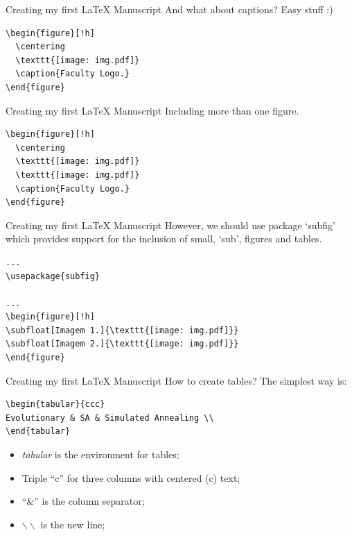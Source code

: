 \begin{frame}[fragile]{Creating my first \LaTeX{} Manuscript}
And what about captions? Easy stuff :)
\footnotesize
\begin{verbatim}
\begin{figure}[!h] 
  \centering                  
  \texttt{[image: img.pdf]}
  \caption{Faculty Logo.}
\end{figure}
\end{verbatim}
\end{frame}

\begin{frame}[fragile]{Creating my first \LaTeX{} Manuscript}
Including more than one figure.
\footnotesize
\begin{verbatim}
\begin{figure}[!h] 
  \centering                  
  \texttt{[image: img.pdf]}
  \texttt{[image: img.pdf]}
  \caption{Faculty Logo.}
\end{figure}
\end{verbatim}
\end{frame}


\begin{frame}[fragile]{Creating my first \LaTeX{} Manuscript}
However, we should use package `subfig' which provides support for the inclusion of small, ‘sub’, figures and tables.
\scriptsize
\begin{verbatim}
...
\usepackage{subfig}

...
\begin{figure}[!h]
\subfloat[Imagem 1.]{\texttt{[image: img.pdf]}}
\subfloat[Imagem 2.]{\texttt{[image: img.pdf]}}
\end{figure}
\end{verbatim}
\end{frame}


\begin{frame}[fragile]{Creating my first \LaTeX{} Manuscript}
How to create tables? The simplest way is:
\footnotesize
\begin{verbatim}
\begin{tabular}{ccc}
Evolutionary & SA & Simulated Annealing \\ 
\end{tabular}
\end{verbatim}
\begin{itemize}
\item \emph{tabular} is the environment for tables;
\item Triple ``c'' for three columns with centered (c) text;
\item ``\&'' is the column separator;
\item $\backslash\backslash$  is the new line;
\end{itemize}
\end{frame}


